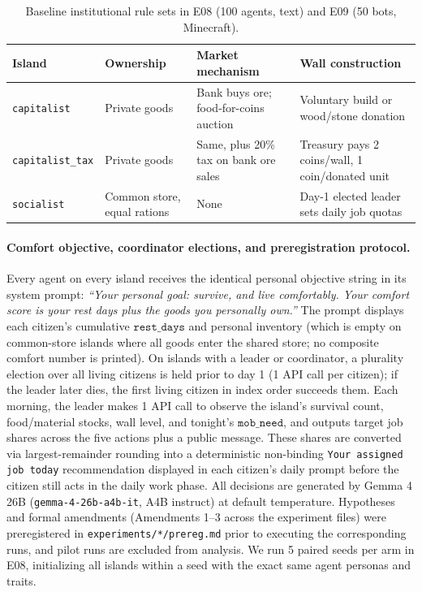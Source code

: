 \documentclass[10pt,letterpaper]{article}
\begin{document}
\begin{table}[!htb]
\centering
\caption{Baseline institutional rule sets in E08 (100 agents, text) and E09 (50 bots, Minecraft).}
\label{tab:rules_e08}
\footnotesize
\setlength{\tabcolsep}{5pt}
\begin{tabularx}{\textwidth}{@{}ll>{\raggedright\arraybackslash}p{4.3cm}>{\raggedright\arraybackslash}X@{}}
\toprule
\textbf{Island} & \textbf{Ownership} & \textbf{Market mechanism} & \textbf{Wall construction} \\
\midrule
\texttt{capitalist} & Private goods & Bank buys ore; food-for-coins auction & Voluntary build or wood/stone donation \\
\texttt{capitalist\_tax} & Private goods & Same, plus 20\% tax on bank ore sales & Treasury pays 2 coins/wall, 1 coin/donated unit \\
\texttt{socialist} & Common store, equal rations & None & Day-1 elected leader sets daily job quotas \\
\bottomrule
\end{tabularx}
\end{table}

\paragraph{Comfort objective, coordinator elections, and preregistration protocol.}
Every agent on every island receives the identical personal objective string in its system prompt: \emph{``Your personal goal: survive, and live comfortably. Your comfort score is your rest days plus the goods you personally own.''} The prompt displays each citizen's cumulative $\texttt{rest\_days}$ and personal inventory (which is empty on common-store islands where all goods enter the shared store; no composite comfort number is printed). On islands with a leader or coordinator, a plurality election over all living citizens is held prior to day 1 (1 API call per citizen); if the leader later dies, the first living citizen in index order succeeds them. Each morning, the leader makes 1 API call to observe the island's survival count, food/material stocks, wall level, and tonight's $\texttt{mob\_need}$, and outputs target job shares across the five actions plus a public message. These shares are converted via largest-remainder rounding into a deterministic non-binding \texttt{Your assigned job today} recommendation displayed in each citizen's daily prompt before the citizen still acts in the daily work phase. All decisions are generated by Gemma 4 26B (\texttt{gemma-4-26b-a4b-it}, A4B instruct) at default temperature. Hypotheses and formal amendments (Amendments 1--3 across the experiment files) were preregistered in \texttt{experiments/*/prereg.md} prior to executing the corresponding runs, and pilot runs are excluded from analysis. We run 5 paired seeds per arm in E08, initializing all islands within a seed with the exact same agent personas and traits.
\end{document}
